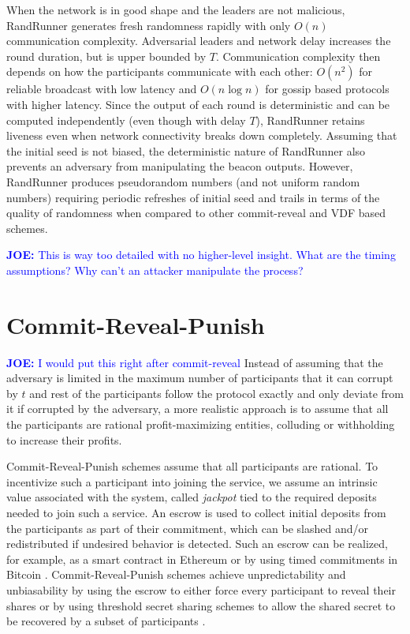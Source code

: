 \documentclass[letterpaper,twocolumn,10pt]{article}
\theoremstyle{definition}
\theoremstyle{remark}
\newcommand{\joenote}[1]{\textcolor{blue}{\textbf{JOE:} #1}}
\begin{document}
When the network is in good shape and the leaders are not malicious, RandRunner generates fresh randomness rapidly with only $O(n)$ communication complexity. Adversarial leaders and network delay increases the round duration, but is upper bounded by $T$. Communication complexity then depends on how the participants communicate with each other: $O(n^2)$ for reliable broadcast with low latency and $O(n \log n)$ for gossip based protocols with higher latency. Since the output of each round is deterministic and can be computed independently (even though with delay $T$), RandRunner retains liveness even when network connectivity breaks down completely. Assuming that the initial seed is not biased, the deterministic nature of RandRunner also prevents an adversary from manipulating the beacon outputs. However, RandRunner produces pseudorandom numbers (and not uniform random numbers) requiring periodic refreshes of initial seed and trails in terms of the quality of randomness when compared to other commit-reveal and VDF based schemes.

\joenote{This is way too detailed with no higher-level insight. What are the timing assumptions? Why can't an attacker manipulate the process?}

\section{Commit-Reveal-Punish}
\joenote{I would put this right after commit-reveal}
\label{section:commit-reveal-punish}
Instead of assuming that the adversary is limited in the maximum number of participants  that it can corrupt by $t$ and rest of the participants follow the protocol exactly and only deviate from it if corrupted by the adversary, a more realistic approach is to assume that all the participants are rational profit-maximizing entities, colluding or withholding to increase their profits. 

Commit-Reveal-Punish schemes assume that all participants are rational. To incentivize such a participant into joining the service, we assume an intrinsic value associated with the system, called \emph{jackpot} tied to the required deposits needed to join such a service. An escrow is used to collect initial deposits from the participants as part of their commitment, which can be slashed and/or redistributed if undesired behavior is detected. Such an escrow can be realized, for example, as a smart contract in Ethereum \cite{youcai2017randao, david2020economically} or by using timed commitments \cite{boneh2000timed} in Bitcoin \cite{andrychowicz2014secure}.  Commit-Reveal-Punish schemes achieve unpredictability and unbiasability by using the escrow to either force every participant to reveal their shares \cite{youcai2017randao, andrychowicz2014secure} or by using threshold secret sharing schemes to allow the shared secret to be recovered by a subset of participants \cite{david2020economically}. 
\end{document}

